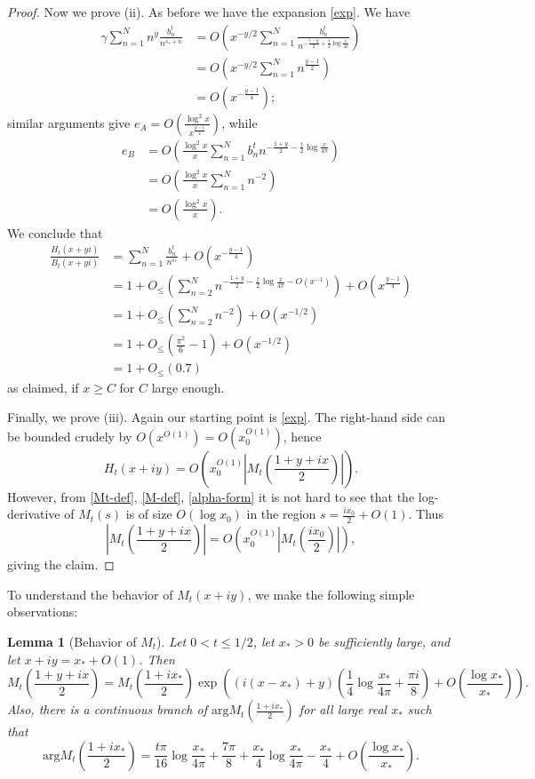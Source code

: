 \documentclass[a4paper,11pt,twoside]{amsart}
\newtheorem{lemma}[theorem]{Lemma}
\begin{document}
\begin{proof}
Now we prove (ii).  As before we have the expansion \eqref{exp}.  We have
\begin{align*}
\gamma \sum_{n=1}^N n^y \frac{b_n^t}{n^{\overline{s_*} + \kappa}} &= O\left( x^{-y/2} \sum_{n=1}^N \frac{b_n^t}{n^{-\frac{1-y}{2} + \frac{t}{2} \log \frac{x}{4\pi}}} \right) \\
&= O\left( x^{-y/2} \sum_{n=1}^N n^{\frac{y-1}{2}} \right) \\
&= O(x^{-\frac{y-1}{4}});
\end{align*}
similar arguments give $e_A = O( \frac{\log^2 x}{x^{\frac{y-1}{4}}} )$, while
\begin{align*}
e_B &= O\left( \frac{\log^2 x}{x} \sum_{n=1}^N b_n^t n^{-\frac{1+y}{2}-\frac{t}{2} \log \frac{x}{4\pi}} \right) \\
&= O\left( \frac{\log^2 x}{x} \sum_{n=1}^N n^{-2} \right) \\
&= O\left( \frac{\log^2 x}{x} \right).
\end{align*}
We conclude that
\begin{align*}
\frac{H_t(x+yi)}{B_t(x+yi)} &= \sum_{n=1}^N \frac{b_n^t}{n^{s_*}} + O( x^{-\frac{y-1}{4}} ) \\
&= 1 + O_{\leq}\left( \sum_{n=2}^N n^{-\frac{1+y}{2} - \frac{t}{2} \log \frac{x}{4\pi} - O(x^{-1})} \right) + O( x^{\frac{y-1}{4}} ) \\
&= 1 + O_{\leq}\left( \sum_{n=2}^N n^{-2} \right) + O( x^{-1/2}) \\
&= 1 + O_{\leq}\left( \frac{\pi^2}{6} - 1 \right) + O( x^{-1/2} ) \\
&= 1 + O_{\leq}( 0.7 )
\end{align*}
as claimed, if $x \geq C$ for $C$ large enough.

Finally, we prove (iii).  Again our starting point is \eqref{exp}.  The right-hand side can be bounded crudely by $O( x^{O(1)}) = O(x_0^{O(1)})$, hence
$$ H_t(x+iy) = O\left( x_0^{O(1)} \left|M_t\left( \frac{1+y+ix}{2} \right)\right| \right).$$
However, from \eqref{Mt-def}, \eqref{M-def}, \eqref{alpha-form} it is not hard to see that the log-derivative of $M_t(s)$ is of size $O( \log x_0 )$ in the region $s = \frac{ix_0}{2} + O(1)$.  Thus
$$ \left|M_t\left( \frac{1+y+ix}{2} \right)\right| = O\left( x_0^{O(1)} \left|M_t\left( \frac{ix_0}{2} \right)\right| \right),$$
giving the claim.
\end{proof}

To understand the behavior of $M_t(x+iy)$, we make the following simple observations:

\begin{lemma}[Behavior of $M_t$]\label{mtform}  Let $0 < t \leq 1/2$, let $x_* > 0$ be sufficiently large, and let $x+iy = x_* + O(1)$.  Then
$$ M_t\left(\frac{1+y+ix}{2}\right) = M_t\left(\frac{1+ix_*}{2}\right) \exp\left( (i(x-x_*)+y) \left(\frac{1}{4} \log \frac{x_*}{4\pi} + \frac{\pi i}{8}\right) + O\left( \frac{\log x_*}{x_*}\right) \right).$$
Also, there is a continuous branch of $\mathrm{arg} M_t\left(\frac{1+ix_*}{2}\right)$ for all large real $x_*$ such that
$$ \mathrm{arg} M_t\left(\frac{1+ix_*}{2}\right) = \frac{t \pi}{16} \log \frac{x_*}{4\pi} + \frac{7\pi}{8} 
+ \frac{x_*}{4} \log \frac{x_*}{4\pi} - \frac{x_*}{4} + O( \frac{\log x_*}{x_*} ).$$
\end{lemma}
\end{document}
